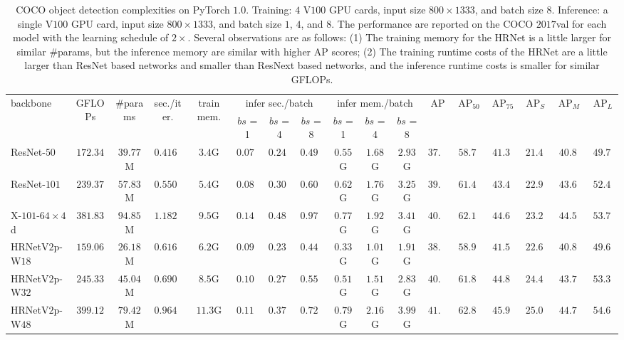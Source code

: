 \documentclass[10pt,journal,compsoc]{IEEEtran}
\begin{document}
\begin{table}[!htbp]
    \centering\setlength{\tabcolsep}{3pt}
    \scriptsize
    \caption{
    \footnotesize COCO object detection complexities
    on PyTorch $1.0$.
    Training: $4$ V$100$ GPU cards, input size $800 \times 1333$,
    and batch size $8$.
    Inference: a single V$100$ GPU card,
    input size $800\times1333$,
    and batch size $1$, $4$, and $8$.
    The performance are reported on the COCO $2017$val for each model with the learning schedule of $2\times$.
    Several observations are as follows:
    (1) The training memory for the HRNet is a little larger for similar \#params,
    but the inference memory are similar with higher AP scores;
    (2) The training runtime costs of the HRNet
    are a little larger than ResNet based networks and smaller than ResNext based networks, and the inference runtime costs is smaller for similar GFLOPs.}
    \vspace{-.2cm}
    \label{tab:pytorch_det_comparison}
    \begin{tabular}{l|cc|cc|ccc|ccc|cccccc}
        \hline %
		\multirow{2}{*}{backbone} & \multirow{2}{*}{GFLOPs}  & \multirow{2}{*}{\#params} & \multirow{2}{*}{sec./iter.} &\multirow{2}{*}{train mem.}& \multicolumn{3}{c|}{infer sec./batch} & 
		\multicolumn{3}{c|}{infer mem./batch} & 
		\multirow{2}{*}{$\operatorname{AP}$} & 
		\multirow{2}{*}{$\operatorname{AP}_{50}$} & \multirow{2}{*}{$\operatorname{AP}_{75}$} & \multirow{2}{*}{$\operatorname{AP}_{S}$} & 
		\multirow{2}{*}{$\operatorname{AP}_{M}$} &
		\multirow{2}{*}{$\operatorname{AP}_{L}$} \\
		\cline{6-11}
		& & & & & $bs$ = 1 & $bs$ = 4 & $bs$ = 8 & $bs$ = 1 & $bs$ = 4 & $bs$ = 8 & & & & & & \\
		\hline

        \hline
        ResNet-$50$   & $172.34$ & $39.77$M & $0.4167$ & $3.4$G & $0.0739$ & $0.2495$ & $0.4921$ & $0.55$G & $1.68$G & $2.93$G & $37.6$ & $58.7$ & $41.3$ & $21.4$ & $40.8$ & $49.7$\\
        ResNet-$101$  & $239.37$ & $57.83$M & $0.5502$ & $5.4$G & $0.0870$ & $0.3018$ & $0.6089$ & $0.62$G & $1.76$G & $3.25$G & $39.8$ & $61.4$ & $43.4$ & $22.9$ & $43.6$ & $52.4$\\
        X-$101$-$64\times4$d & $381.83$ & $94.85$M & $1.1828$ & $9.5$G & $0.1438$ & $0.4832$ & $0.9764$ & $0.77$G & $1.92$G & $3.41$G & $40.8$ & $62.1$ & $44.6$ & $23.2$ & $44.5$ & $53.7$\\
        \hline
        HRNetV$2$p-W$18$  & $159.06$ & $26.18$M & $0.6166$ & $6.2$G & $0.0968$ & $0.2320$ & $0.4471$ & $0.33$G & $1.01$G & $1.91$G & $38.0$ & $58.9$ & $41.5$ & $22.6$ & $40.8$ & $49.6$\\
        HRNetV$2$p-W$32$  & $245.33$ & $45.04$M & $0.6901$ & $8.5$G & $0.1014$ & $0.2738$ & $0.5546$ & $0.51$G & $1.51$G & $2.83$G & $40.9$ & $61.8$ & $44.8$ & $24.4$ & $43.7$ & $53.3$ \\
        HRNetV$2$p-W$48$  & $399.12$ & $79.42$M & $0.9648$ & $11.3$G & $0.1162$& $0.3762$ & $0.7296$ & $0.79$G  & $2.16$G & $3.99$G & $41.8$ & $62.8$ & $45.9$ & $25.0$ & $44.7$ & $54.6$\\
        \hline
    \end{tabular} 
\end{table}
\end{document}

